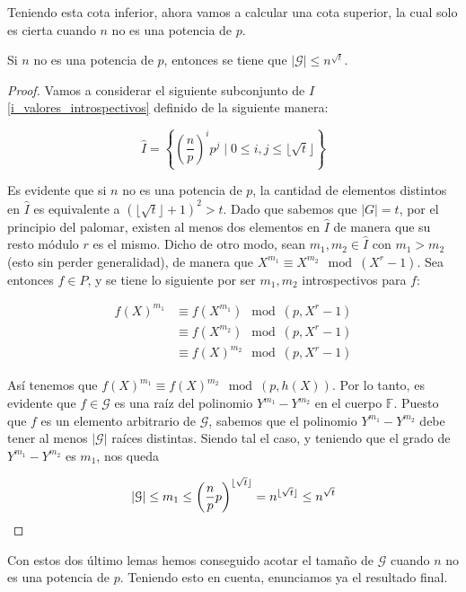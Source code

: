 Teniendo esta cota inferior, ahora vamos a calcular una cota superior, la cual solo es cierta cuando $n$ no es una potencia de $p$.

\begin{lema}\label{cota_superior_G}
	Si $n$ no es una potencia de $p$, entonces se tiene que $|\mathcal{G}| \leq n^{\sqrt{t}}$.
\end{lema}

\begin{proof}
	Vamos a considerar el siguiente subconjunto de $I$ \eqref{i_valores_introspectivos} definido de la siguiente manera:
	
	\begin{equation}\label{subconjunto_de_I}
	\hat{I} = \left\{\left(\frac{n}{p}\right)^ip^j \mid 0 \leq i,j \leq \lfloor \sqrt{t} \rfloor \right\}
	\end{equation}
	
	Es evidente que si $n$ no es una potencia de $p$, la cantidad de elementos distintos en $\hat{I}$ es equivalente a $(\lfloor \sqrt{t} \rfloor + 1)^2 > t$. Dado que sabemos que $|G| = t$, por el principio del palomar, existen al menos dos elementos en $\hat{I}$ de manera que su resto módulo $r$ es el mismo. Dicho de otro modo, sean $m_1, m_2 \in \hat{I}$ con $m_1 > m_2$ (esto sin perder generalidad), de manera que $X^{m_1} \equiv X^{m_2} \mod(X^r - 1)$. Sea entonces $f \in P$, y se tiene lo siguiente por ser $m_1, m_2$ introspectivos para $f$:
	
	\begin{align}
	f(X)^{m_1} &\equiv f(X^{m_1}) \mod(p, X^r-1)\\
	&\equiv f(X^{m_2}) \mod(p, X^r-1)\\
	&\equiv f(X)^{m_2} \mod(p, X^r-1)
	\end{align}
	
	Así tenemos que $f(X)^{m_1} \equiv f(X)^{m_2} \mod(p, h(X))$. Por lo tanto, es evidente que $f \in \mathcal{G}$ es una raíz del polinomio $Y^{m_1} - Y^{m_2}$ en el cuerpo $\mathbb{F}$. Puesto que $f$ es un elemento arbitrario de $\mathcal{G}$, sabemos que el polinomio $Y^{m_1} - Y^{m_2}$ debe tener al menos $|\mathcal{G}|$ raíces distintas. Siendo tal el caso, y teniendo que el grado de $Y^{m_1} - Y^{m_2}$ es $m_1$, nos queda
	
	\[|\mathcal{G}| \leq m_1 \leq \left(\frac{n}{p}p\right)^{\lfloor\sqrt{t}\rfloor} = n^{\lfloor\sqrt{t}\rfloor} \leq n^{\sqrt{t}}\qedhere \]
\end{proof}

Con estos dos último lemas hemos conseguido acotar el tamaño de $\mathcal{G}$ cuando $n$ no es una potencia de $p$. Teniendo esto en cuenta, enunciamos ya el resultado final.

